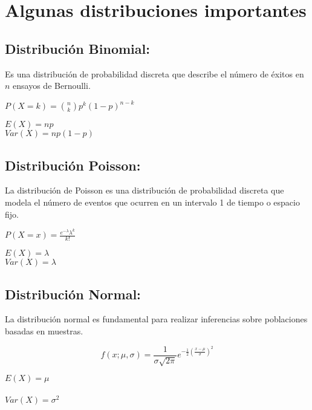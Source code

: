 \documentclass{report}
\begin{document}
\section{Algunas distribuciones importantes}
\iffalse
\subsection{Distribución de Bernoulli:}
Una distribución de probabilidad discreta que modela un experimento aleatorio que tiene 
únicamente dos resultados. Estos resultados
se suelen llamar éxito (con probabilidad
\(p\)) y fracaso (con probabilidad \((1-p)\))

\begin{multicols}{2}

\(P(X=x) = p^x(1-p)^{1-x}\)

\(E(X) = p\)
\columnbreak
\\
\(Var(X) = E[(X-p)^2]\)

\end{multicols}
\fi
\subsection{Distribución Binomial:}
Es una distribución de probabilidad discreta que describe el número de éxitos en \(n\) ensayos de Bernoulli. 
\begin{multicols}{2}
 \(P(X = k) = \binom{n}{k}p^k(1-p)^{n-k}\)
 
\(E(X) = np\)
\columnbreak
\\
\(Var(X) = np(1-p)\)
\end{multicols}
\subsection{Distribución Poisson:}
La distribución de Poisson es una distribución de probabilidad discreta que modela el número de eventos que ocurren en un intervalo 1  de tiempo o espacio fijo. 
\begin{multicols}{2}
    \(P(X =x) = \frac{e^{-\lambda}\lambda^k}{k!}\)

    \(E(X) = \lambda\)
    \columnbreak
    \\
    \(Var(X) = \lambda\)
\end{multicols}
\subsection{Distribución Normal:}
La distribución normal es fundamental para realizar inferencias sobre poblaciones basadas en muestras.
\begin{multicols}{2}
    \[f(x; \mu, \sigma) = \frac{1}{\sigma \sqrt{2\pi}}e^{-\frac{1}{2}(\frac{x-\mu}{\sigma})^2} \]

    \(E(X) = \mu\)
    \columnbreak
    \\
    \\
    \(Var(X) = \sigma^2\)
\end{multicols}
\end{document}
